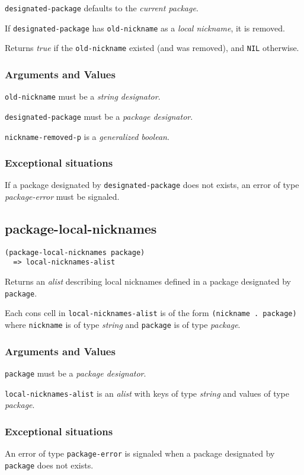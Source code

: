 \documentclass[11pt]{article}
\begin{document}
\texttt{designated-package} defaults to the \emph{current package}.

If \texttt{designated-package} has \texttt{old-nickname} as a \emph{local nickname}, it is
removed.

Returns \emph{true} if the \texttt{old-nickname} existed (and was removed), and \texttt{NIL}
otherwise.
\subsubsection{Arguments and Values}
\label{sec:orgf9232c3}
\texttt{old-nickname} must be a \emph{string designator}.

\texttt{designated-package} must be a \emph{package designator}.

\texttt{nickname-removed-p} is a \emph{generalized boolean}.
\subsubsection{Exceptional situations}
\label{sec:org4f0c62c}
If a package designated by \texttt{designated-package} does not exists, an error of
type \emph{package-error} must be signaled.
\subsection{package-local-nicknames}
\label{sec:org5016aae}
\begin{verbatim}
(package-local-nicknames package)
  => local-nicknames-alist
\end{verbatim}

Returns an \emph{alist} describing local nicknames defined in a package
designated by \texttt{package}.

Each cons cell in \texttt{local-nicknames-alist} is of the form \texttt{(nickname . package)}
where \texttt{nickname} is of type \emph{string} and \texttt{package} is of type
\emph{package}.
\subsubsection{Arguments and Values}
\label{sec:org79c4226}
\texttt{package} must be a \emph{package designator}.

\texttt{local-nicknames-alist} is an \emph{alist} with keys of type \emph{string} and
values of type \emph{package}.
\subsubsection{Exceptional situations}
\label{sec:org6d9b543}
An error of type \texttt{package-error} is signaled when a package designated by
\texttt{package} does not exists.
\end{document}
